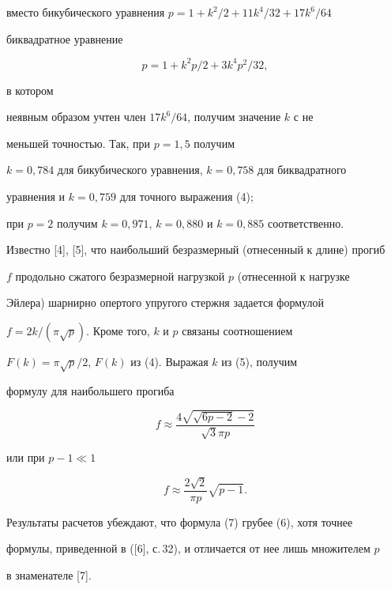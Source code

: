 вместо бикубического уравнения $p= 1+k^2/2+11k^4/32+17k^6/64$ 


биквадратное уравнение 


\begin{equation}


p= 1+k^2p/2+3k^4p^2/32,


\end{equation}


в котором 


неявным образом учтен член $17k^6/64$, получим значение $k$ с не 


меньшей точностью. Так, при $p= 1{,}5$ получим 


$k=0{,}784$ для бикубического уравнения, $k=0{,}758$ для биквадратного 


уравнения и $k=0{,}759$ для точного выражения (4); 


при $p= 2$ получим $k=0{,}971$, $k=0{,}880$ и $k=0{,}885$ соответственно.  





Известно [4], [5], что наибольший безразмерный (отнесенный к длине) прогиб 


$f$ продольно сжатого безразмерной нагрузкой $p$ (отнесенной к нагрузке 


Эйлера) шарнирно опертого упругого стержня задается формулой 


$f=2k/(\pi \sqrt p).$ Кроме того, $k$ и $p$ связаны соотношением 


$F(k)=\pi \sqrt p/2$, $F(k)$ из (4). Выражая $k$ из (5), получим 


формулу для наибольшего прогиба     


\begin{equation}


f\approx\frac{4\sqrt{\sqrt{6p-2}-2}}{\sqrt 3\pi p}


\end{equation}


или при $p-1\ll 1$  


\begin{equation}


f\approx\frac{2\sqrt{2}}{\pi p}\sqrt{p-1}.


\end{equation}


Результаты расчетов убеждают, что формула (7) грубее (6), хотя точнее 


формулы, приведенной в ([6], с.\,32), и отличается от нее лишь множителем $p$ 


в знаменателе [7]. 



